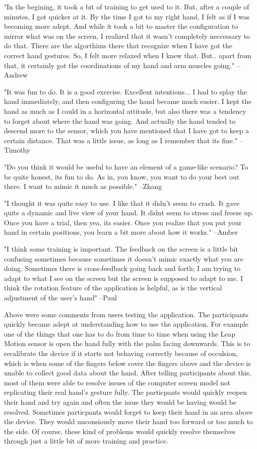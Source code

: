 "In the begining, it took a bit of training to get used to it. But, after a couple of minutes, I got quicker at it. By the time I got to my right hand, I felt as if I was becoming more adept. And while it took a bit to master the configuration to mirror what was on the screen, I realized that it wasn't completely neccessary to do that. There are the algorthims there that recognize when I have got the correct hand gestures. So, I felt more relaxed when I knew that. But.. apart from that, it certainly got the coordinations of my hand and arm muscles going." --Andrew

"It was fun to do. It is a good exercise. Excellent intentions... I had to splay the hand immediately, and then configuring the hand became much easier. I kept the hand as much as I could in a horizontal attitude, but also there was a tendency to forget about where the hand was going. And actually the hand tended to descend more to the sensor, which you have mentioned that I have got to keep a certain distance. That was a little issue, as long as I remember that its fine." --Timothy

"Do you think it would be useful to have an element of a game-like scenario? To be quite honest, its fun to do. As in, you know, you want to do your best out there. I want to mimic it much as possible." --Zhang

"I thought it was quite easy to use. I like that it didn't seem to crash. It gave quite a dynamic and live view of your hand. It didnt seem to stress and freeze up. Once you have a trial, then yea, its easier. Once you realize that you put your hand in certain positions, you learn a bit more about how it works." --Amber

"I think some training is important. The feedback on the screen is a little bit confusing sometimes because sometimes it doesn't mimic exactly what you are doing. Sometimes there is cross-feedback going back and forth; I am trying to adapt to what I see on the screen but the screen is supposed to adapt to me. I think the rotation feature of the application is helpful, as is the vertical adjustment of the user's hand" --Paul

Above were some comments from users testing the application. The participants quickly became adept at understanding how to use the application. For example one of the things that one has to do from time to time when using the Leap Motion sensor is open the hand fully with the palm facing downwards. This is to recalibrate the device if it starts not behaving correctly because of occulsion, which is when some of the fingers below cover the fingers above and the device is unable to collect good data about the hand. After telling participants about this, most of them were able to resolve issues of the computer screen model not replicating their real hand's gesture fully. The particpants would quickly reopen their hand and try again and often the issue they would be having would be resolved. Sometimes particpants would forget to keep their hand in an area above the device. They would unconsiously move their hand too forward or too much to the side. Of course, these kind of problems would quickly resolve themselves through just a little bit of more training and practice. 


